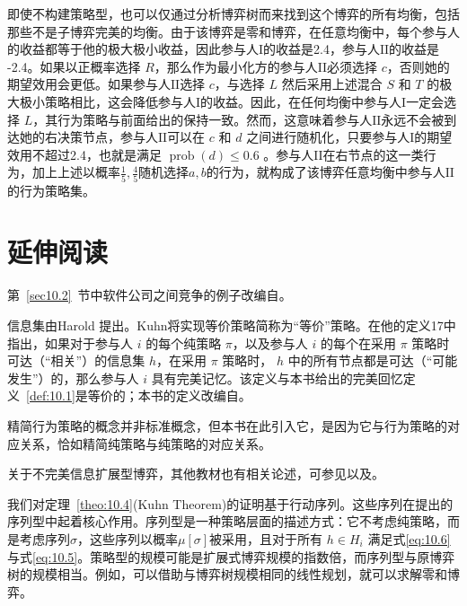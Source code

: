 即使不构建策略型，也可以仅通过分析博弈树而来找到这个博弈的所有均衡，包括那些不是子博弈完美的均衡。由于该博弈是零和博弈，在任意均衡中，每个参与人的收益都等于他的极大极小收益，因此参与人$\mathrm{I}$的收益是2.4，参与人$\mathrm{II}$的收益是 -2.4。如果以正概率选择 \(R\)，那么作为最小化方的参与人$\mathrm{II}$必须选择 \(c\)，否则她的期望效用会更低。如果参与人$\mathrm{II}$选择 \(c\)，与选择 \(L\) 然后采用上述混合 \(S\) 和 \(T\) 的极大极小策略相比，这会降低参与人$\mathrm{I}$的收益。因此，在任何均衡中参与人$\mathrm{I}$一定会选择 \(L\)，其行为策略与前面给出的保持一致。然而，这意味着参与人$\mathrm{II}$永远不会被到达她的右决策节点，参与人$\mathrm{II}$可以在 \(c\) 和 \(d\) 之间进行随机化，只要参与人$\mathrm{I}$的期望效用不超过2.4，也就是满足 \(\operatorname{prob}\left( d\right)  \leq  {0.6}\) 。参与人$\mathrm{II}$在右节点的这一类行为，加上上述以概率\(\frac{1}{5},\frac{4}{5}\)随机选择\(a,b\)的行为，就构成了该博弈任意均衡中参与人$\mathrm{II}$的行为策略集。

\section{延伸阅读}\label{sec10.11}

第~\ref{sec10.2}~节中软件公司之间竞争的例子改编自\citet{turocy2002}。

信息集由Harold \citet{kuhn1953}提出。Kuhn将实现等价策略简称为“等价”策略。在他的定义17中指出，如果对于参与人 \(i\) 的每个纯策略 \(\pi\)，以及参与人 \(i\) 的每个在采用 \(\pi\) 策略时可达（“相关”）的信息集 \(h\)，在采用 \(\pi\) 策略时， \(h\) 中的所有节点都是可达（“可能发生”）的，那么参与人 \(i\) 具有完美记忆。该定义与本书给出的完美回忆定义~\ref{def:10.1}是等价的；本书的定义改编自\citet[p.~27]{selten1975}。


精简行为策略的概念并非标准概念，但本书在此引入它，是因为它与行为策略的对应关系，恰如精简纯策略与纯策略的对应关系。

关于不完美信息扩展型博弈，其他教材也有相关论述，可参见\citet[Chapter~11]{osborne1994}以及\citet[Section~2.4]{gibbons1992}。

我们对定理~\ref{theo:10.4}(Kuhn Theorem)的证明基于行动序列。这些序列在\citet{vonstengel1996}提出的序列型中起着核心作用。序列型是一种策略层面的描述方式：它不考虑纯策略，而是考虑序列\(\sigma\)，这些序列以概率\(\mu \left\lbrack  \sigma \right\rbrack\)被采用，且对于所有 \(h \in  {H}_{i}\) 满足式\eqref{eq:10.6}与式\eqref{eq:10.5}。策略型的规模可能是扩展式博弈规模的指数倍，而序列型与原博弈树的规模相当。例如，可以借助与博弈树规模相同的线性规划，就可以求解零和博弈。


